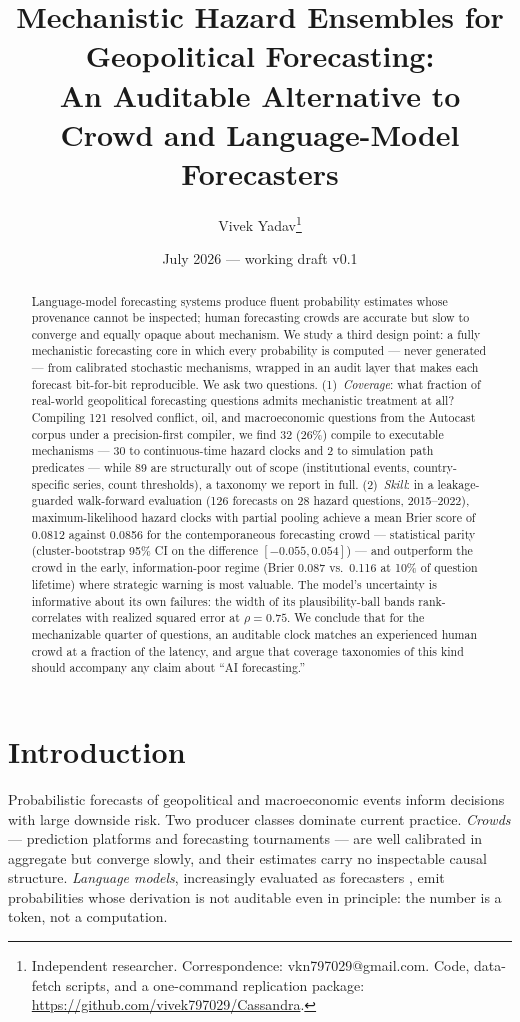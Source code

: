 \documentclass[11pt]{article}
\title{Mechanistic Hazard Ensembles for Geopolitical Forecasting:\\
An Auditable Alternative to Crowd and Language-Model Forecasters}
\author{Vivek Yadav\thanks{Independent researcher. Correspondence: vkn797029@gmail.com.
Code, data-fetch scripts, and a one-command replication package:
\url{https://github.com/vivek797029/Cassandra}.}}
\date{July 2026 — working draft v0.1}
\begin{document}
\maketitle

\begin{abstract}
Language-model forecasting systems produce fluent probability estimates whose
provenance cannot be inspected; human forecasting crowds are accurate but
slow to converge and equally opaque about mechanism. We study a third design
point: a fully mechanistic forecasting core in which every probability is
computed --- never generated --- from calibrated stochastic mechanisms, wrapped
in an audit layer that makes each forecast bit-for-bit reproducible. We ask
two questions. (1)~\emph{Coverage}: what fraction of real-world geopolitical
forecasting questions admits mechanistic treatment at all? Compiling 121
resolved conflict, oil, and macroeconomic questions from the Autocast corpus
under a precision-first compiler, we find 32 (26\%) compile to executable
mechanisms --- 30 to continuous-time hazard clocks and 2 to simulation path
predicates --- while 89 are structurally out of scope (institutional events,
country-specific series, count thresholds), a taxonomy we report in full.
(2)~\emph{Skill}: in a leakage-guarded walk-forward evaluation (126 forecasts
on 28 hazard questions, 2015--2022), maximum-likelihood hazard clocks with
partial pooling achieve a mean Brier score of 0.0812 against 0.0856 for the
contemporaneous forecasting crowd --- statistical parity (cluster-bootstrap
95\% CI on the difference $[-0.055, 0.054]$) --- and outperform the crowd in
the early, information-poor regime (Brier 0.087 vs.\ 0.116 at 10\% of question
lifetime) where strategic warning is most valuable. The model's uncertainty
is informative about its own failures: the width of its
plausibility-ball bands rank-correlates with realized squared error at
$\rho = 0.75$. We conclude that for the mechanizable quarter of questions, an
auditable clock matches an experienced human crowd at a fraction of the
latency, and argue that coverage taxonomies of this kind should accompany any
claim about ``AI forecasting.''
\end{abstract}

\section{Introduction}
Probabilistic forecasts of geopolitical and macroeconomic events inform
decisions with large downside risk. Two producer classes dominate current
practice. \emph{Crowds} --- prediction platforms and forecasting tournaments
--- are well calibrated in aggregate \citep{tetlock2015} but converge slowly,
and their estimates carry no inspectable causal structure. \emph{Language
models}, increasingly evaluated as forecasters \citep{zou2022}, emit
probabilities whose derivation is not auditable even in principle: the number
is a token, not a computation.
\end{document}
